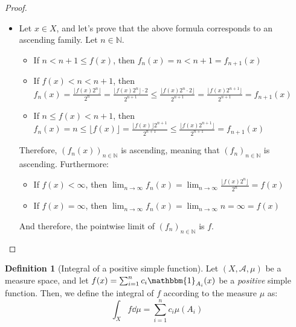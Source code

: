 \documentclass{article}
\theoremstyle{definition}
\newtheorem{definition}{Definition}[section]
\theoremstyle{remark}
\theoremstyle{example}
\theoremstyle{notation}
\theoremstyle{axiom}
\newcommand{\tif}{\text{if }}
\begin{document}
\begin{proof}
\begin{itemize}
\begin{itemize}
								$$f_n(x) = n\mathbbm{1}_{f^{-1}([n, \infty[)} + \sum_{j=0}^{n2^n - 1} \frac{j}{2^n}\mathbbm{1}_{A_j^{(n)}} = \frac{i}{2^n} = \frac{\lfloor f(x)2^n \rfloor}{2^n}$$
				\end{itemize}
				Therefore, the general formula for $(f_n(x))_{n \in \mathbb{N}}$ is:
				$$f_n(x) = \begin{cases} n & \tif n \leq f(x) \\ \frac{\lfloor f(x)2^n \rfloor}{2^n} & \tif n > f(x)\end{cases}$$
				\item Let $x \in X$, and let's prove that the above formula corresponds to an ascending family. Let $n \in \mathbb{N}$.
				\begin{itemize}
						\item If $n < n + 1 \leq f(x)$, then $f_n(x) = n < n + 1 = f_{n + 1}(x)$
						\item If $f(x) < n < n + 1$, then $f_n(x) = \frac{\lfloor f(x)2^n \rfloor}{2^n} = \frac{\lfloor f(x)2^n \rfloor \cdot 2}{2^{n+1}} \leq \frac{\lfloor f(x)2^n \cdot 2 \rfloor}{2^{n+1}} = \frac{\lfloor f(x)2^{n+1} \rfloor}{2^{n+1}} = f_{n+1}(x)$
						\item If $n \leq f(x) < n+1$, then $f_n(x) = n \leq \lfloor f(x) \rfloor = \frac{\lfloor f(x) \rfloor 2^{n+1}}{2^{n+1}} \leq \frac{\lfloor f(x) 2^{n+1} \rfloor}{2^{n+1}} = f_{n+1}(x)$
				\end{itemize}
				Therefore, $(f_n(x))_{n \in \mathbb{N}}$ is ascending, meaning that $(f_n)_{n \in \mathbb{N}}$ is ascending. Furthermore:
				\begin{itemize}
						\item If $f(x) < \infty$, then $\lim_{n \rightarrow \infty} f_n(x) = \lim_{n \rightarrow \infty} \frac{\lfloor f(x)2^n \rfloor}{2^n} = f(x)$
						\item If $f(x) = \infty$, then $\lim_{n \rightarrow \infty} f_n(x) = \lim_{n \rightarrow \infty} n = \infty = f(x)$
				\end{itemize}
				And therefore, the pointwise limit of $(f_n)_{n \in \mathbb{N}}$ is $f$.
		\end{itemize} 
\end{proof}

\begin{definition}[Integral of a positive simple function]
		Let $(X, \mathcal{A}, \mu)$ be a measure space, and let $f(x) = \sum_{i=1}^n c_i \mathbbm{1}_{A_i}(x)$ be a \textit{positive} simple function. Then, we define the integral of $f$ according to the measure $\mu$ as:
				$$\int_X f \dd \mu = \sum_{i=1}^n c_i \mu(A_i)$$
\end{definition}
\end{document}
